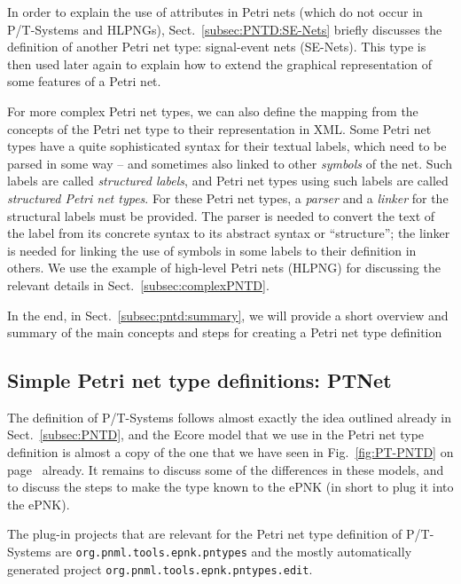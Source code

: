 In order to explain the use of attributes in Petri nets (which do not occur
in P/T-Systems and HLPNGs), Sect.~\ref{subsec:PNTD:SE-Nets} briefly discusses
the definition of another Petri net type: signal-event nets (SE-Nets). This type is
then used later again to explain how to extend the graphical representation of
some features of a Petri net.

For more complex Petri net types, we can also define the mapping from the
concepts of the Petri net type to their representation in XML. Some Petri
net types have a quite sophisticated syntax for their textual labels,
which need to be parsed in some way -- and sometimes also linked to
other \emph{symbols} of the net. Such labels are called \emph{structured labels},
and Petri net types using such labels are called \emph{structured Petri net
types}. For these Petri net types, a \emph{parser} and a \emph{linker} for
the structural labels must be provided. The parser is needed to convert the
text of the label from its concrete syntax to its abstract
syntax or ``structure''; the linker is needed for linking the use of symbols in
some labels to their definition in others. We use the example of high-level Petri nets (HLPNG)
for discussing the relevant details in Sect.~\ref{subsec:complexPNTD}.

In the end, in Sect.~\ref{subsec:pntd:summary}, we will provide a short overview
and summary of the main concepts and steps for creating a Petri net type definition 
  
\subsection{Simple Petri net type definitions: PTNet}
\label{subsec:simplePNTD}

The definition of P/T-Systems follows almost exactly the idea outlined
already in Sect.~\ref{subsec:PNTD}, and the Ecore model that we use in the
Petri net type definition is almost a copy of the one that we have seen in
Fig.~\ref{fig:PT-PNTD} on page~\pageref{fig:PT-PNTD} already. It remains to
discuss some of the differences in these models, and to discuss the steps to
make the type known to the ePNK (in short to plug it into the ePNK).

The plug-in projects that are relevant for the Petri net type definition
of P/T-Systems are {\tt org.pnml.tools.epnk.pntypes} and the mostly
automatically generated project {\tt org.pnml.tools.epnk.pntypes.edit}.

